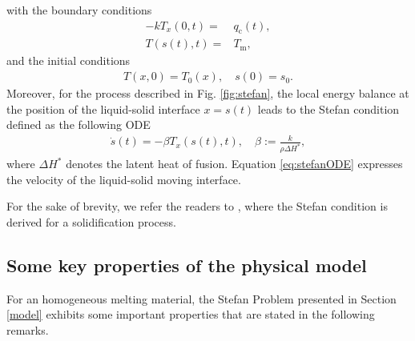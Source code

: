 \documentclass[journal]{IEEEtran}
\begin{document}
with the boundary conditions
\begin{align}\label{eq:stefancontrol}
-k T_x(0,t)=&q_{{\mathrm c}}(t), \\ \label{eq:stefanBC}
T(s(t),t)=&T_{{\mathrm m}},
\end{align}
and the initial conditions
\begin{align}\label{eq:stefanIC}
T(x,0)=T_0(x), \quad s(0) = s_0.
\end{align}
Moreover, for the process described in Fig. \ref{fig:stefan}, 
the local  energy balance at the position of the liquid-solid interface $x=s(t)$ leads to the Stefan condition defined as  the following ODE
\begin{align}\label{eq:stefanODE}
 \dot{s}(t)=-\beta T_x(s(t),t), \quad \beta :=\frac{k}{\rho \Delta H^*},
\end{align}
where $\Delta H^*$ denotes the latent heat of fusion.
Equation \eqref{eq:stefanODE}   expresses the velocity of the liquid-solid moving interface. 

For the sake of brevity, we refer the readers to  \cite{Gupta03}, where the Stefan condition is derived for a solidification process. 
\subsection{Some key properties of the physical model} 

For an  homogeneous melting material, the Stefan Problem presented in Section \ref{model}
 exhibits some important properties  that are stated in the following remarks.
\end{document}
